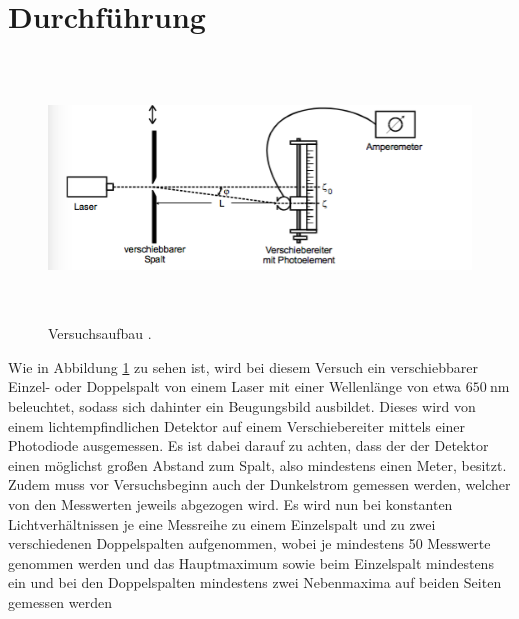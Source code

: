 \section{Durchführung}
\label{sec:Durchführung}
\begin{figure}[H]
  \centering
  \includegraphics[height=7cm]{Aufbau.png}
  \caption{Versuchsaufbau \cite{skript}.}
  \label{fig:aufbau}
\end{figure}
Wie in Abbildung \ref{fig:aufbau} zu sehen ist, wird bei diesem Versuch ein
verschiebbarer Einzel- oder Doppelspalt von einem Laser mit einer Wellenlänge von
etwa $\SI{650}{\nano\meter} $ beleuchtet, sodass sich dahinter ein Beugungsbild
ausbildet. Dieses wird von einem lichtempfindlichen Detektor auf einem
Verschiebereiter mittels einer Photodiode ausgemessen.
Es ist dabei darauf zu achten, dass der der Detektor einen
möglichst großen Abstand zum Spalt, also mindestens einen Meter, besitzt.
Zudem muss vor Versuchsbeginn auch der Dunkelstrom gemessen werden, welcher
von den Messwerten jeweils abgezogen wird.
Es wird nun bei konstanten Lichtverhältnissen je eine Messreihe zu einem Einzelspalt
und zu zwei verschiedenen Doppelspalten aufgenommen, wobei je mindestens 50
Messwerte genommen werden und das Hauptmaximum sowie beim Einzelspalt mindestens ein
und bei den Doppelspalten mindestens zwei Nebenmaxima auf beiden Seiten gemessen werden
